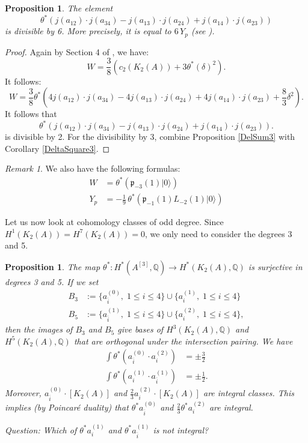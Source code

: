 \documentclass{amsart}
\newcommand{\hilb}[1]{^{[#1]}}
\newcommand{\vac}{|0\rangle}
\newcommand{\p}{\mathfrak{p}}
\newcommand{\pone}{ \mathfrak{p}_{ - 1} }
\newcommand{\kum}[2]{K_{ #2 }( #1 )}
\newcommand{\Q}{\mathbb{Q}}
\theoremstyle{plain}
\newtheorem{proposition}[theorem]{Proposition}
\theoremstyle{definition}
\theoremstyle{remark}
\newtheorem{remark}[theorem]{Remark}
\begin{document}
\begin{proposition}
The element 
$$\theta^{*}\left(j(a_{12})\cdot j(a_{34})-j(a_{13})\cdot j(a_{24})+j(a_{14})\cdot j(a_{23})\right)$$ 
is divisible by 6. More precisely, it is equal to $6\,Y_p$ (see \cite{HassettTschinkel}).
\end{proposition}
\begin{proof}
Again by Section 4 of \cite{HassettTschinkel}, we have:
$$W=\frac{3}{8}(c_{2}(K_{2}(A))+3\theta^{*}(\delta)^2).$$
It follows:
\begin{equation}
W=\frac{3}{8}\theta^{*}\left(4j(a_{12})\cdot j(a_{34})-4j(a_{13})\cdot j(a_{24})+4j(a_{14})\cdot j(a_{23})+\frac{8}{3}\delta^{2}\right).
\label{W}
\end{equation}
It follows that 
$$\theta^{*}(j(a_{12})\cdot j(a_{34})-j(a_{13})\cdot j(a_{24})+j(a_{14})\cdot j(a_{23})).$$
is divisible by 2.
For the divisibility by 3, combine Proposition \ref{DelSum3} with Corollary \ref{DeltaSquare3}.
\end{proof}
\begin{remark}
We also have the following formulas:
\begin{align}
W &= \theta^* \left(\p_{-3}(1)\vac\right) \\
Y_p & = -\tfrac{1}{9}\, \theta^* \left( \pone(1) L_{-2}(1)\vac\right)
\end{align}
\end{remark}
Let us now look at cohomology classes of odd degree. Since $H^1(\kum{A}{2}) = H^7(\kum{A}{2}) =0$, we only need to consider the degrees 3 and 5.
\begin{proposition}
The map $\theta^* : H^*(A\hilb{3} ,\Q) \rightarrow H^*(\kum{A}{2},\Q)$ is surjective in degrees 3 and 5. 
If we set
\begin{align}
B_3 &:= \{ a_{\overline{i}}^{(0)},\; 1\leq i\leq 4\} \cup \{ a_{i}^{(1)},\; 1\leq i\leq 4\}  \\
B_5 &:= \{ a_{\overline{i}}^{(1)},\; 1\leq i\leq 4\} \cup \{ a_{i}^{(2)},\; 1\leq i\leq 4\} ,
\end{align}
then the images of $B_3$ and $B_5$ give bases of $H^3(\kum{A}{2},\Q)$ and $H^5(\kum{A}{2},\Q)$ that are orthogonal under the intersection pairing.
We have
\begin{align}
\int \theta^* \left( a_{\overline{ i}}^{(0)} \cdot  a_i^{(2)}  \right ) &= \pm \frac{3}{2} \\
\int \theta^* \left( a_i^{(1)} \cdot a_{\overline{ i}}^{(1)} \right ) &= \pm \frac{1}{2}.
\end{align}
Moreover, $a_{\overline{ i}}^{(0)}\cdot[\kum{A}{2}]$ and $\frac{2}{3} a_i^{(2)}\cdot[\kum{A}{2}]$ are integral classes. 
This implies (by Poincar\'e duality) that $\theta^* a_{\overline{ i}}^{(0)}$ and $\frac{2}{3} \theta^*a_i^{(2)} $ are integral. 

Question: Which of $\theta^*  a_i^{(1)} $ and $ \theta^*a_{\overline{ i}}^{(1)}$ is not integral?
\end{proposition}
 
\end{document}
